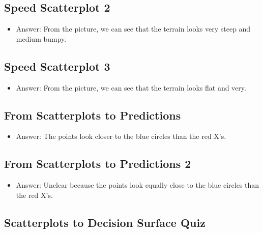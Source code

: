 \documentclass[12pt]{report}
\begin{document}
\subsection{Speed Scatterplot 2}

\begin{itemize}

\item Answer: From the picture, we can see that the terrain looks very steep and medium bumpy. 

\end{itemize}

\subsection{Speed Scatterplot 3}

\begin{itemize}

\item Answer: From the picture, we can see that the terrain looks flat and very. 

\end{itemize}

\subsection{From Scatterplots to Predictions}

\begin{itemize}

\item Answer: The points look closer to the blue circles than the red X's. 

\end{itemize}

\subsection{From Scatterplots to Predictions 2}

\begin{itemize}

\item Answer: Unclear because the points look equally close to the blue circles than the red X's. 

\end{itemize}

\subsection{Scatterplots to Decision Surface Quiz}
\end{document}
